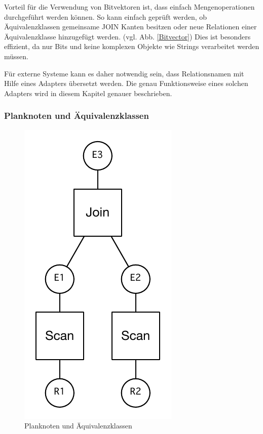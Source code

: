 Vorteil für die Verwendung von Bitvektoren ist, dass einfach Mengenoperationen durchgeführt werden können. So kann einfach geprüft werden, ob Äquivalenzklassen gemeinsame JOIN Kanten besitzen oder neue Relationen einer Äquivalenzklasse hinzugefügt werden. (vgl. Abb. \ref{Bitvector}) Dies ist besonders effizient, da nur Bits und keine komplexen Objekte wie Strings verarbeitet werden müssen.


Für externe Systeme kann es daher notwendig sein, dass Relationsnamen mit Hilfe eines Adapters übersetzt werden. Die genau Funktionsweise eines solchen Adapters wird in diesem Kapitel genauer beschrieben.




\subsubsection{Planknoten und Äquivalenzklassen}





\begin{figure}[ht]
  \centering
  \includegraphics{04_Implementierung/JoinScan.pdf}
  \caption{Planknoten und Äquivalenzklassen}
  \label{PlanAequi}
\end{figure}

